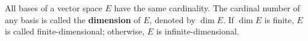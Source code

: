 All bases of a vector space $E$ have the same cardinality. The cardinal number of any basis is called the \textbf{dimension} of $E$, denoted by $\dim E$. If $\dim E$ is finite, $E$ is called finite-dimensional; otherwise, $E$ is infinite-dimensional.
